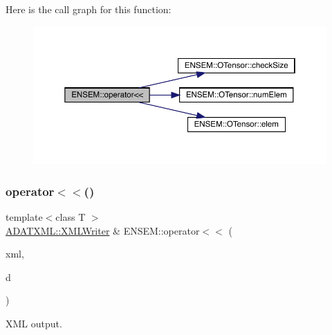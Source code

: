 Here is the call graph for this function\+:\nopagebreak
\begin{figure}[H]
\begin{center}
\leavevmode
\includegraphics[width=350pt]{de/d87/group__obstensor_ga64bc4e87abaefe7d97e074a4cb88e035_cgraph}
\end{center}
\end{figure}
\mbox{\label{group__obstensor_gaa5233df95541acbbe7762e49152aaeb5}} 
\subsubsection{\texorpdfstring{operator$<$$<$()}{operator<<()}\hspace{0.1cm}{\footnotesize\ttfamily [3/3]}}
{\footnotesize\ttfamily template$<$class T $>$ \\
\mbox{\hyperlink{classADATXML_1_1XMLWriter}{A\+D\+A\+T\+X\+M\+L\+::\+X\+M\+L\+Writer}} \& E\+N\+S\+E\+M\+::operator$<$$<$ (\begin{DoxyParamCaption}\item[{\mbox{\hyperlink{classADATXML_1_1XMLWriter}{A\+D\+A\+T\+X\+M\+L\+::\+X\+M\+L\+Writer}} \&}]{xml,  }\item[{const \mbox{\hyperlink{classENSEM_1_1OTensor}{O\+Tensor}}$<$ T $>$ \&}]{d }\end{DoxyParamCaption})\hspace{0.3cm}{\ttfamily [inline]}}



X\+ML output. 

